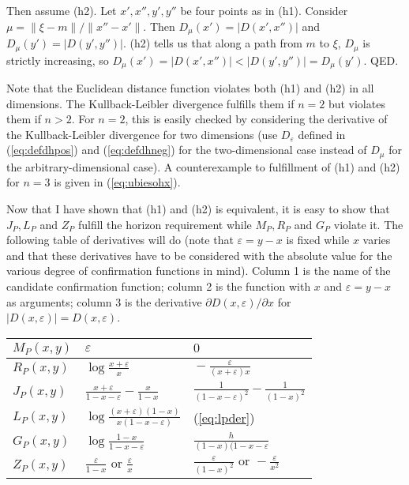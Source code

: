 \documentclass[11pt]{article}
\begin{document}
Then assume (h2). Let $x',x'',y',y''$ be four points as in (h1).
Consider $\mu=\|\xi-m\|/\|x''-x'\|$. Then $D_{\mu}(x')=|D(x',x'')|$
and $D_{\mu}(y')=|D(y',y'')|$. (h2) tells us that along a path from
$m$ to $\xi$, $D_{\mu}$ is strictly increasing, so
$D_{\mu}(x')=|D(x',x'')|<|D(y',y'')|=D_{\mu}(y')$. QED.

Note that the Euclidean distance function violates both (h1) and (h2)
in all dimensions. The Kullback-Leibler divergence fulfills them if
$n=2$ but violates them if $n>2$. For $n=2$, this is easily checked by
considering the derivative of the Kullback-Leibler divergence for two
dimensions (use $D_{\varepsilon}$ defined in (\ref{eq:defdhpos}) and
(\ref{eq:defdhneg}) for the two-dimensional case instead of $D_{\mu}$
for the arbitrary-dimensional case). A counterexample to fulfillment
of (h1) and (h2) for $n=3$ is given in (\ref{eq:ubiesohx}).

Now that I have shown that (h1) and (h2) is equivalent, it is easy to
show that $J_{P},L_{P}$ and $Z_{P}$ fulfill the horizon requirement
while $M_{P},R_{P}$ and $G_{P}$ violate it. The following table of
derivatives will do (note that $\varepsilon=y-x$ is fixed while $x$
varies and that these derivatives have to be considered with the
absolute value for the various degree of confirmation functions in
mind). Column 1 is the name of the candidate confirmation function;
column 2 is the function with $x$ and $\varepsilon=y-x$ as arguments;
column 3 is the derivative $\partial{}D(x,\varepsilon)/\partial{}x$ for
$|D(x,\varepsilon)|=D(x,\varepsilon)$. 

\begin{tabular}{|l|l|l|}\hline
  $M_{P}(x,y)$ & $\displaystyle{}\varepsilon$ & $0$ \\ \hline
  $R_{P}(x,y)$ & $\displaystyle{}\log\frac{x+\varepsilon}{x}$ & $\displaystyle{}-\frac{\varepsilon}{(x+\varepsilon)x}$ \\ \hline
  $J_{P}(x,y)$ & $\displaystyle{}\frac{x+\varepsilon}{1-x-\varepsilon}-\frac{x}{1-x}$ & $\displaystyle{}\frac{1}{(1-x-\varepsilon)^{2}}-\frac{1}{(1-x)^{2}}$ \\ \hline
  $L_{P}(x,y)$ & $\displaystyle{}\log\frac{(x+\varepsilon)(1-x)}{x(1-x-\varepsilon)}$ & (\ref{eq:lpder}) \\ \hline
  $G_{P}(x,y)$ & $\displaystyle{}\log\frac{1-x}{1-x-\varepsilon}$ & $\displaystyle{}\frac{h}{(1-x)(1-x-\varepsilon}$ \\ \hline
  $Z_{P}(x,y)$ & $\displaystyle{}\frac{\varepsilon}{1-x}\mbox{ or }\frac{\varepsilon}{x}$ & $\displaystyle{}\frac{\varepsilon}{(1-x)^{2}}\mbox{ or }-\frac{\varepsilon}{x^{2}}$ \\ \hline
\end{tabular}
\end{document}
